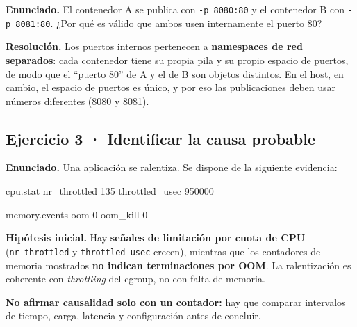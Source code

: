 \documentclass[11pt,a4paper]{article}
\newcommand{\cmd}[1]{\texttt{#1}}
\begin{document}
\textbf{Enunciado.} El contenedor A se publica con \cmd{-p 8080:80} y el contenedor B con
\cmd{-p 8081:80}. ¿Por qué es válido que ambos usen internamente el puerto 80?

\begin{center}
\end{center}

\textbf{Resolución.} Los puertos internos pertenecen a \textbf{namespaces de red separados}:
cada contenedor tiene su propia pila y su propio espacio de puertos, de modo que el
\textquotedblleft puerto 80\textquotedblright{} de A y el de B son objetos distintos. En el host, en cambio, el espacio
de puertos es único, y por eso las publicaciones deben usar números diferentes (8080 y 8081).

\subsection*{Ejercicio 3 · Identificar la causa probable}

\textbf{Enunciado.} Una aplicación se ralentiza. Se dispone de la siguiente evidencia:

\begin{codigo}
cpu.stat
  nr_throttled    135
  throttled_usec  950000

memory.events
  oom       0
  oom_kill  0
\end{codigo}

\textbf{Hipótesis inicial.} Hay \textbf{señales de limitación por cuota de CPU}
(\cmd{nr\_throttled} y \cmd{throttled\_usec} crecen), mientras que los contadores de
memoria mostrados \textbf{no indican terminaciones por OOM}. La ralentización es
coherente con \emph{throttling} del cgroup, no con falta de memoria.

\begin{errorbox}
\textbf{No afirmar causalidad solo con un contador:} hay que comparar intervalos de tiempo,
carga, latencia y configuración antes de concluir.
\end{errorbox}
\end{document}
